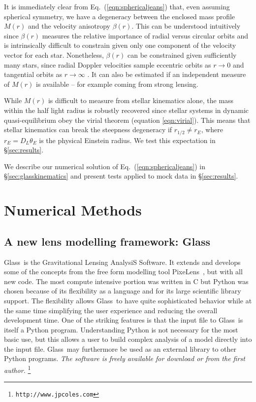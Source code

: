 \documentclass[galley,usenatbib]{mn2e}
\newcommand{\Glass}{{\sc Glass}}
\newcommand{\PixeLens}{{\sc PixeLens}}
\newcommand{\Mddd}{\ensuremath{M}}
\newcommand{\url}[1]{\tt #1}
\newcommand{\eqnref}[1] {Eq.~(\ref{#1})}
\newcommand{\secref}[1] {\S\ref{#1}}
\begin{document}
It is immediately clear from \eqnref{eqn:sphericaljeans} that, even assuming
spherical symmetry, we have a degeneracy between the enclosed mass profile
$\Mddd(r)$ and the velocity anisotropy $\beta(r)$. This can be understood
intuitively since $\beta(r)$ measures the relative importance of radial versus
circular orbits and is intrinsically difficult to constrain given only one
component of the velocity vector for each star. Nonetheless, $\beta(r)$ can be
constrained given sufficiently many stars, since radial Doppler velocities
sample eccentric orbits as $r\rightarrow 0$ and tangential orbits as
$r\rightarrow \infty$ \citep[e.g.][]{2002MNRAS.330..778W}. It can also be
estimated if an independent measure of $\Mddd(r)$ is available -- for example
coming from strong lensing. 

While $\Mddd(r)$ is difficult to measure from stellar kinematics alone, the
mass within the half light radius is robustly recovered
\citep[e.g.][]{2009ApJ...704.1274W,2010MNRAS.406.1220W,2012ApJ...754L..39A}
since stellar systems in dynamic quasi-equilibrium obey the virial theorem
(equation \ref{eqn:virial}). This means that stellar kinematics can break the
steepness degeneracy if $r_{1/2} \neq r_E$, where $r_E = D_L \theta_E$ is the
physical Einstein radius. We test this expectation in \secref{sec:results}.

We describe our numerical solution of \eqnref{eqn:sphericaljeans} in
\secref{sec:glasskinematics} and present tests applied to mock data in
\secref{sec:results}. 

\section{Numerical Methods}\label{sec:glass}

\subsection{A new lens modelling framework: \Glass}

\Glass\ is the Gravitational Lensing AnalysiS Software. It extends and develops
some of the concepts from the free form modelling tool \PixeLens\
\citep{Saha2004,2008ApJ...679...17C}, but with all new code.  The most compute
intensive portion was written in C but Python was chosen because of its
flexibility as a language and for its large scientific library support. The
flexibility allows \Glass\ to have quite sophisticated behavior while at the
same time simplifying the user experience and reducing the overall development
time. One of the striking features is that the input file to \Glass\ is itself
a Python program.  Understanding Python is not necessary for the most basic
use, but this allows a user to build complex analysis of a model directly into
the input file. \Glass\ may furthermore be used as an external library to other
Python programs.  {\it The software is freely available for download or from
the first author.}%
%
\footnote{\url{http://www.jpcoles.com}}
\end{document}

